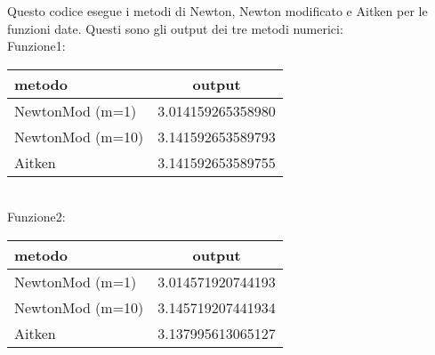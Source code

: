 
Questo codice esegue i metodi di Newton, Newton modificato e Aitken per le funzioni date.
Questi sono gli output dei tre metodi numerici:\\
Funzione1:\\
\begin{tabular}{lc}
metodo & output \\
\hline
NewtonMod (m=1) & 3.014159265358980 \\
NewtonMod (m=10)& 3.141592653589793 \\
Aitken & 3.141592653589755 \\
\end{tabular}\\
Funzione2:\\
\begin{tabular}{lc}
metodo & output \\
\hline
NewtonMod (m=1) & 3.014571920744193 \\
NewtonMod (m=10)& 3.145719207441934 \\
Aitken & 3.137995613065127 \\
\end{tabular}\\
